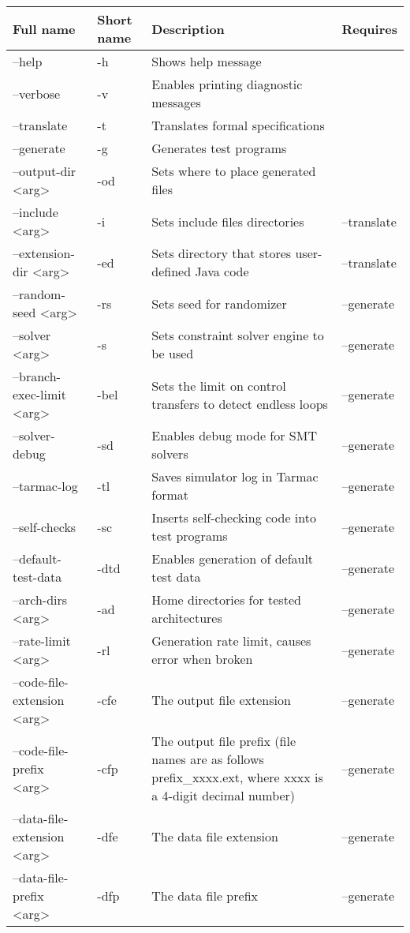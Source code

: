 \documentclass[oneside,final,12pt]{extreport}
\begin{document}
\begin{tabular}{ | p{4cm} | p{1cm} | p{5cm} | p{2.5cm} |}
  \hline
  \textbf{Full name} & \textbf{Short name} & \textbf{Description} & \textbf{Requires} \\ \hline
  --help & -h & Shows help message & \\ \hline
  --verbose & -v & Enables printing diagnostic messages & \\ \hline
  --translate & -t & Translates formal specifications & \\ \hline
  --generate & -g & Generates test programs & \\ \hline
  --output-dir <arg> & -od & Sets where to place generated files & \\ \hline
  --include <arg> & -i & Sets include files directories & --translate \\ \hline
  --extension-dir <arg> & -ed & Sets directory that stores user-defined Java code & --translate \\ \hline
  --random-seed <arg> & -rs & Sets seed for randomizer & --generate \\ \hline
  --solver <arg> & -s & Sets constraint solver engine to be used & --generate \\ \hline
  --branch-exec-limit <arg> & -bel & Sets the limit on control transfers to detect endless loops & --generate \\ \hline
  --solver-debug & -sd & Enables debug mode for SMT solvers & --generate \\ \hline
  --tarmac-log & -tl & Saves simulator log in Tarmac format & --generate \\ \hline
  --self-checks & -sc & Inserts self-checking code into test programs & --generate \\ \hline
  --default-test-data & -dtd & Enables generation of default test data & --generate \\ \hline
  --arch-dirs <arg> & -ad & Home directories for tested architectures & --generate \\ \hline
  --rate-limit <arg> & -rl & Generation rate limit, causes error when broken & --generate \\ \hline
  --code-file-extension <arg> & -cfe & The output file extension & --generate \\ \hline
  --code-file-prefix <arg> & -cfp & The output file prefix (file names are as follows prefix{\_}xxxx.ext, where xxxx is a 4-digit decimal number) & --generate \\ \hline
  --data-file-extension <arg> & -dfe & The data file extension & --generate \\ \hline
  --data-file-prefix <arg> & -dfp & The data file prefix & --generate \\ \hline
\end{tabular}
\end{document}
